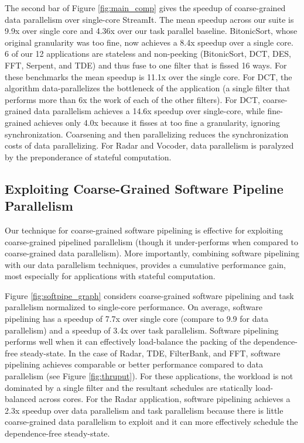 The second bar of Figure \ref{fig:main_comp} gives the speedup of
coarse-grained data parallelism over single-core StreamIt. The mean
speedup across our suite is 9.9x over single core and 4.36x over our
task parallel baseline.  BitonicSort, whose original granularity was
too fine, now achieves a 8.4x speedup over a single core. 6 of our 12
applications are stateless and non-peeking (BitonicSort, DCT, DES,
FFT, Serpent, and TDE) and thus fuse to one filter that is fissed 16
ways.  For these benchmarks the mean speedup is 11.1x over the
single core.  For DCT, the algorithm data-parallelizes the bottleneck
of the application (a single filter that performs more than 6x the
work of each of the other filters).  For DCT, coarse-grained data
parallelism achieves a 14.6x speedup over single-core, while
fine-grained achieves only 4.0x because it fisses at too fine a
granularity, ignoring synchronization.  Coarsening and then
parallelizing reduces the synchronization costs of data parallelizing.
For Radar and Vocoder, data parallelism is paralyzed by the
preponderance of stateful computation.

\subsection{Exploiting Coarse-Grained Software Pipeline Parallelism}

Our technique for coarse-grained software pipelining is effective for
exploiting coarse-grained pipelined parallelism (though it
under-performs when compared to coarse-grained data parallelism).
More importantly, combining software pipelining with our data
parallelism techniques, provides a cumulative performance gain, most
especially for applications with stateful computation.

Figure \ref{fig:softpipe_graph} considers coarse-grained software
pipelining and task parallelism normalized to single-core performance.
On average, software pipelining has a speedup of 7.7x over single core
(compare to 9.9 for data parallelism) and a speedup of 3.4x over task
parallelism. Software pipelining performs well when it can effectively
load-balance the packing of the dependence-free steady-state.  In the
case of Radar, TDE, FilterBank, and FFT, software pipelining achieves
comparable or better performance compared to data parallelism (see
Figure \ref{fig:thruput}).  For these applications, the workload is
not dominated by a single filter and the resultant schedules are
statically load-balanced across cores.  For the Radar application,
software pipelining achieves a 2.3x speedup over data parallelism and
task parallelism because there is little coarse-grained data
parallelism to exploit and it can more effectively schedule the
dependence-free steady-state.


